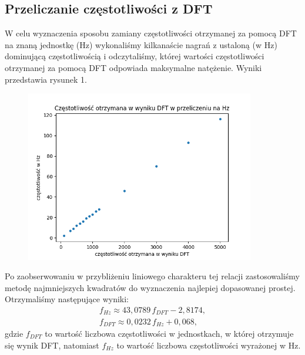 \documentclass[polish]{article}
\begin{document}
\subsection{Przeliczanie częstotliwości z DFT}
W celu wyznaczenia sposobu zamiany częstotliwości otrzymanej za pomocą DFT na znaną jednostkę (Hz) wykonaliśmy kilkanaście nagrań z ustaloną (w Hz) dominującą częstotliwością i odczytaliśmy, której wartości częstotliwości otrzymanej za pomocą DFT odpowiada maksymalne natężenie. Wyniki przedstawia rysunek 1.
\begin{figure}[H]
	\centering
	\includegraphics[width=10cm]{przeliczanie_dft_hz}
	\caption{}
\end{figure}
\noindent Po zaobserwowaniu w przybliżeniu liniowego charakteru tej relacji zastosowaliśmy metodę najmniejszych kwadratów do wyznaczenia najlepiej dopasowanej prostej. Otrzymaliśmy następujące wyniki:
\begin{gather*}
	f_{\unit{Hz}}\approx43,0789\,f_{\unit{DFT}}-2,8174,\\
	f_{\unit{DFT}}\approx0,0232\,f_{\unit{Hz}}+0,068,
\end{gather*}
gdzie $f_{\unit{DFT}}$ to wartość liczbowa częstotliwości w jednostkach, w której otrzymuje się wynik DFT, natomiast $f_{\unit{Hz}}$ to wartość liczbowa częstotliwości wyrażonej w \unit{Hz}.
\end{document}
